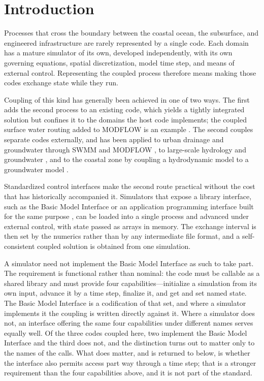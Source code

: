 \documentclass[preprint,authoryear,11pt]{elsarticle}
\begin{document}
\section{Introduction}

Processes that cross the boundary between the coastal ocean, the subsurface, and engineered infrastructure are rarely represented by a single code. Each domain has a mature simulator of its own, developed independently, with its own governing equations, spatial discretization, model time step, and means of external control. Representing the coupled process therefore means making those codes exchange state while they run.

Coupling of this kind has generally been achieved in one of two ways. The first adds the second process to an existing code, which yields a tightly integrated solution but confines it to the domains the host code implements; the coupled surface water routing added to MODFLOW is an example \citep{hughes2014swr}. The second couples separate codes externally, and has been applied to urban drainage and groundwater through SWMM and MODFLOW \citep{zhang2020swmmmodflow, li2022urbansaturated, tajari2026compound}, to large-scale hydrology and groundwater \citep{guillaumot2022cwatm}, and to the coastal zone by coupling a hydrodynamic model to a groundwater model \citep{jin2025gwocean}.

Standardized control interfaces make the second route practical without the cost that has historically accompanied it. Simulators that expose a library interface, such as the Basic Model Interface \citep{hutton2020bmi} or an application programming interface built for the same purpose \citep{hughes2022modflowapi}, can be loaded into a single process and advanced under external control, with state passed as arrays in memory. The exchange interval is then set by the numerics rather than by any intermediate file format, and a self-consistent coupled solution is obtained from one simulation.

A simulator need not implement the Basic Model Interface as such to take part. The requirement is functional rather than nominal: the code must be callable as a shared library and must provide four capabilities---initialize a simulation from its own input, advance it by a time step, finalize it, and get and set named state. The Basic Model Interface is a codification of that set, and where a simulator implements it the coupling is written directly against it. Where a simulator does not, an interface offering the same four capabilities under different names serves equally well. Of the three codes coupled here, two implement the Basic Model Interface and the third does not, and the distinction turns out to matter only to the names of the calls. What does matter, and is returned to below, is whether the interface also permits access part way through a time step; that is a stronger requirement than the four capabilities above, and it is not part of the standard.
\end{document}
